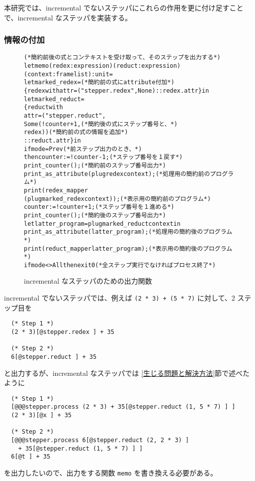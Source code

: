 本研究では、incremental でないステッパにこれらの作用を更に付け足すことで、incremental なステッパを実装する。

\subsubsection{情報の付加}

\begin{figure}[t]
  \begin{alltt}
(* 簡約前後の式とコンテキストを受け取って、そのステップを出力する *)
let memo (redex : expression) (reduct : expression)
    (context : frame list) : unit =
  let marked\_redex =                             (* 簡約前の式に attribute 付加 *)
    \{redex with attr = ("stepper.redex", None) :: redex.attr\} in
  let marked\_reduct =
    \{reduct with
     attr = ("stepper.reduct",
             Some (!counter + 1,                  (* 簡約後の式にステップ番号と、 *)
                   redex))                            (* 簡約前の式の情報を追加 *)
            :: reduct.attr\} in
  if mode = Prev                                       (* 前ステップ出力のとき、 *)
  then counter := !counter - 1;                          (* ステップ番号を１戻す *)
  print\_counter ();                                  (* 簡約前のステップ番号出力 *)
  print\_as\_attribute (plug redex context);          (* 処理用の簡約前のプログラム *)
  print (redex\_mapper
           (plug marked\_redex context));           (* 表示用の簡約前のプログラム *)
  counter := !counter + 1;                             (* ステップ番号を１進める *)
  print\_counter ();                                  (* 簡約後のステップ番号出力 *)
  let latter\_program = plug marked\_reduct context in
  print\_as\_attribute (latter\_program);              (* 処理用の簡約後のプログラム *)
  print (reduct\_mapper latter\_program);            (* 表示用の簡約後のプログラム *)
  if mode <> All then exit 0               (* 全ステップ実行でなければプロセス終了 *)
  \end{alltt}
  \caption{incremental なステッパのための出力関数}
  \label{figure:new-memo}
\end{figure}

incremental でないステッパでは、例えば \texttt{(2 * 3) + (5 * 7)} に対して、2 ステップ目を
\begin{verbatim}
  (* Step 1 *)
  (2 * 3)[@stepper.redex ] + 35

  (* Step 2 *)
  6[@stepper.reduct ] + 35
\end{verbatim}
と出力するが、incremental なステッパでは \ref{生じる問題と解決方法}節で述べたように
\begin{verbatim}
  (* Step 1 *)
  [@@@stepper.process (2 * 3) + 35[@stepper.reduct (1, 5 * 7) ] ]
  (2 * 3)[@x ] + 35

  (* Step 2 *)
  [@@@stepper.process 6[@stepper.reduct (2, 2 * 3) ]
    + 35[@stepper.reduct (1, 5 * 7) ] ]
  6[@t ] + 35
\end{verbatim}
を出力したいので、出力をする関数 \texttt{memo} を書き換える必要がある。

